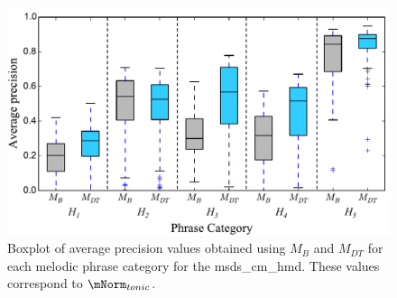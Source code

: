 \begin{figure}
	\begin{center}
		\includegraphics[width=\figSizeEightyFive]{ch06_patterns/figures/ImprovingSimilarity/HindustaniPerCategoryPerformance_BOXPLOT.pdf}
	\end{center}
	\caption{Boxplot of average precision values obtained using $M_{B}$ and $M_{DT}$ for each melodic phrase category for the \acrshort{msds_cm_hmd}. These values correspond to $\mNorm_{tonic}$.} 
	\label{fig:hinudstaniPerCategoryPerformance}
\end{figure}


